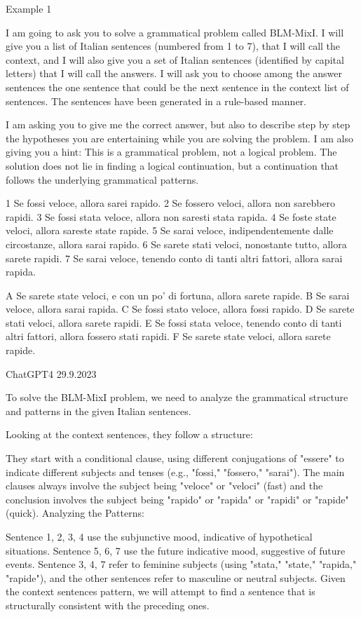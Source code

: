 Example 1

I am going to ask you to solve a grammatical problem called BLM-MixI.  I will give you a list of Italian sentences (numbered from 1 to 7), that I will call the context, and I will also give you a set of Italian sentences (identified by capital letters) that I will call  the answers. I will ask you to choose among the answer sentences the one sentence that could be the next sentence in the context list of sentences. The sentences have been generated in a rule-based manner. 

I am asking you to give me the correct answer, but also to describe step by step  the hypotheses you are entertaining while you are solving the problem.
I am also giving you a hint: This is a grammatical problem, not a logical problem. The solution does not lie in finding a logical continuation, but a continuation that follows the underlying grammatical patterns.

1 Se fossi veloce, allora sarei rapido.
2 Se fossero veloci, allora non sarebbero rapidi.
3 Se fossi stata veloce, allora non saresti stata rapida.
4 Se foste state veloci, allora sareste state rapide.
5 Se sarai veloce, indipendentemente dalle circostanze, allora sarai rapido.
6 Se sarete stati veloci, nonostante tutto, allora sarete rapidi.
7 Se sarai veloce, tenendo conto di tanti altri fattori, allora sarai rapida.

A Se sarete state veloci, e con un po' di fortuna, allora sarete rapide.
B Se sarai veloce, allora sarai rapida.
C Se fossi stato veloce, allora fossi rapido.
D Se sarete stati veloci, allora sarete rapidi.
E Se fossi stata veloce, tenendo conto di tanti altri fattori, allora fossero stati rapidi.
F Se sarete state veloci, allora sarete rapide.

ChatGPT4 29.9.2023

To solve the BLM-MixI problem, we need to analyze the grammatical structure and patterns in the given Italian sentences.

Looking at the context sentences, they follow a structure:

They start with a conditional clause, using different conjugations of "essere" to indicate different subjects and tenses (e.g., "fossi," "fossero," "sarai").
The main clauses always involve the subject being "veloce" or "veloci" (fast) and the conclusion involves the subject being "rapido" or "rapida" or "rapidi" or "rapide" (quick).
Analyzing the Patterns:

Sentence 1, 2, 3, 4 use the subjunctive mood, indicative of hypothetical situations.
Sentence 5, 6, 7 use the future indicative mood, suggestive of future events.
Sentence 3, 4, 7 refer to feminine subjects (using "stata," "state," "rapida," "rapide"), and the other sentences refer to masculine or neutral subjects.
Given the context sentences pattern, we will attempt to find a sentence that is structurally consistent with the preceding ones.

